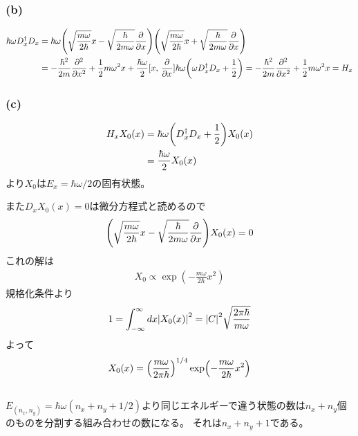 \documentclass[../../master.tex]{subfiles}
\begin{document}
\subsubsection{(b)}
\begin{align}
    \hbar\omega D_x^\dagger D_x
    &= \hbar\omega\qty(
        \sqrt{\frac{m\omega}{2\hbar}}x-\sqrt{\frac{\hbar}{2m\omega}}\pdv{x}
    )\qty(
        \sqrt{\frac{m\omega}{2\hbar}}x+\sqrt{\frac{\hbar}{2m\omega}}\pdv{x}
    )\\
    &= -\frac{\hbar^2}{2m}\pdv[2]{x} + \frac{1}{2}m\omega^2 x
    + \frac{\hbar\omega}{2}[x,\,\pdv{x}]
    \hbar\omega\qty(\omega D_x^\dagger D_x+\frac{1}{2}) = -\frac{\hbar^2}{2m}\pdv[2]{x} + \frac{1}{2}m\omega^2 x = H_x
\end{align}
\subsubsection{(c)}
\begin{align}
    H_xX_0(x) &= \hbar\omega\qty(D_x^\dagger D_x + \frac{1}{2})X_0(x)\\
    &= \frac{\hbar\omega}{2}X_0(x)
\end{align}
より\(X_0\)は\(E_x=\hbar\omega/2\)の固有状態。

また\(D_xX_0(x)=0\)は微分方程式と読めるので
\begin{align}
    \qty(
        \sqrt{\frac{m\omega}{2\hbar}}x-\sqrt{\frac{\hbar}{2m\omega}}\pdv{x}
    )X_0(x) = 0
\end{align}
これの解は
\begin{align}
    X_0 \propto \exp(-\frac{m\omega}{2\hbar}x^2)
\end{align}
規格化条件より
\begin{align}
    1 = \int_{-\infty}^{\infty}dx\abs{X_0(x)}^2 = \abs{C}^2 \sqrt{\frac{2\pi\hbar}{m\omega}}
\end{align}
よって
\begin{align}
    X_0(x) = \qty(\frac{m\omega}{2\pi\hbar})^{1/4}\exp(-\frac{m\omega}{2\hbar}x^2)
\end{align}
\subsection{}
\(E_{(n_x,n_y)}=\hbar\omega(n_x+n_y+1/2)\)より同じエネルギーで違う状態の数は\(n_x+n_y\)個のものを分割する組み合わせの数になる。
それは\(n_x+n_y+1\)である。
\end{document}
